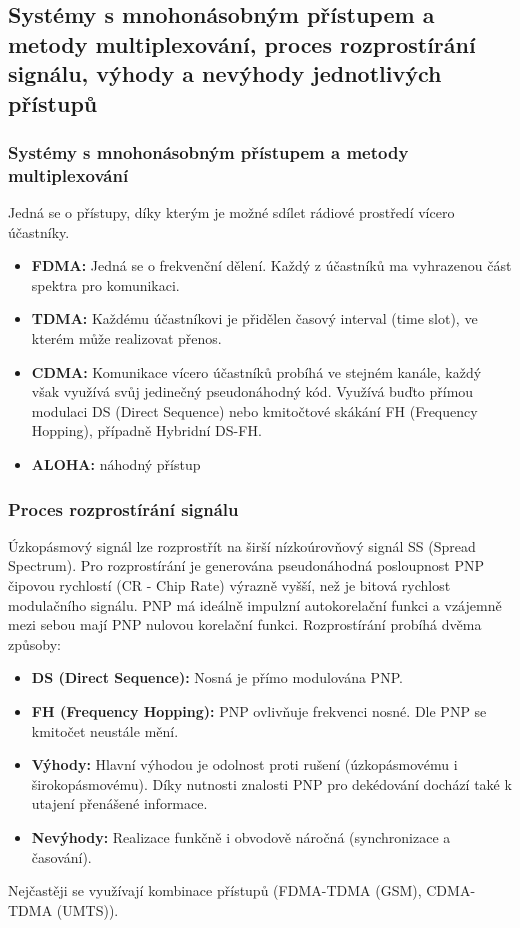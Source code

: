 	\subsection{Systémy s mnohonásobným přístupem a metody multiplexování, proces rozprostírání signálu, výhody a nevýhody jednotlivých přístupů}
		\subsubsection{Systémy s mnohonásobným přístupem a metody multiplexování}
			Jedná se o přístupy, díky kterým je možné sdílet rádiové prostředí vícero účastníky.
			\begin{itemize}
				\item \textbf{FDMA:} Jedná se o frekvenční dělení. Každý z účastníků ma vyhrazenou část spektra pro komunikaci.
				\item \textbf{TDMA:} Každému účastníkovi je přidělen časový interval (time slot), ve kterém může realizovat přenos.
				\item \textbf{CDMA:} Komunikace vícero účastníků probíhá ve stejném kanále, každý však využívá svůj jedinečný pseudonáhodný kód. Využívá buďto přímou modulaci DS (Direct Sequence) nebo kmitočtové skákání FH (Frequency Hopping), případně Hybridní DS-FH.
				\item \textbf{ALOHA:} náhodný přístup
			\end{itemize}
		\subsubsection{Proces rozprostírání signálu}
			Úzkopásmový signál lze rozprostřít na širší nízkoúrovňový signál SS (Spread Spectrum). Pro rozprostírání je generována pseudonáhodná posloupnost PNP čipovou rychlostí (CR - Chip Rate) výrazně vyšší, než je bitová rychlost modulačního signálu. PNP má ideálně impulzní autokorelační funkci a vzájemně mezi sebou mají PNP nulovou korelační funkci. Rozprostírání probíhá dvěma způsoby:
			\begin{itemize}
				\item \textbf{DS (Direct Sequence):} Nosná je přímo modulována PNP.
				\item \textbf{FH (Frequency Hopping):} PNP ovlivňuje frekvenci nosné. Dle PNP se kmitočet neustále mění.
			\end{itemize}
			\begin{itemize}
				\item \textbf{Výhody:} Hlavní výhodou je odolnost proti rušení (úzkopásmovému i širokopásmovému). Díky nutnosti znalosti PNP pro dekédování dochází také k utajení přenášené informace.
				\item \textbf{Nevýhody:} Realizace funkčně i obvodově náročná (synchronizace a časování).
			\end{itemize}
		Nejčastěji se využívají kombinace přístupů (FDMA-TDMA (GSM), CDMA-TDMA (UMTS)).
	
